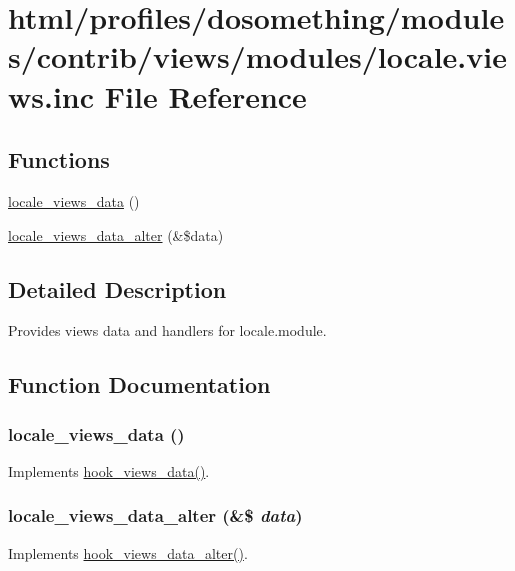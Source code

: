 \hypertarget{locale_8views_8inc}{
\section{html/profiles/dosomething/modules/contrib/views/modules/locale.views.inc File Reference}
\label{locale_8views_8inc}
}
\subsection*{Functions}
\begin{DoxyCompactItemize}
\item 
\hyperlink{locale_8views_8inc_aa2e7c82021bc70c0e3842e8430318690}{locale\_\-views\_\-data} ()
\item 
\hyperlink{locale_8views_8inc_ad47c0998c2231ae085499daa6273eea4}{locale\_\-views\_\-data\_\-alter} (\&\$data)
\end{DoxyCompactItemize}


\subsection{Detailed Description}
Provides views data and handlers for locale.module. 

\subsection{Function Documentation}
\hypertarget{locale_8views_8inc_aa2e7c82021bc70c0e3842e8430318690}{
\subsubsection[{locale\_\-views\_\-data}]{\setlength{\rightskip}{0pt plus 5cm}locale\_\-views\_\-data ()}}
\label{locale_8views_8inc_aa2e7c82021bc70c0e3842e8430318690}
Implements \hyperlink{group__views__hooks_ga227057901681e4a33e33c199c7a8c989}{hook\_\-views\_\-data()}. \hypertarget{locale_8views_8inc_ad47c0998c2231ae085499daa6273eea4}{
\subsubsection[{locale\_\-views\_\-data\_\-alter}]{\setlength{\rightskip}{0pt plus 5cm}locale\_\-views\_\-data\_\-alter (\&\$ {\em data})}}
\label{locale_8views_8inc_ad47c0998c2231ae085499daa6273eea4}
Implements \hyperlink{group__views__hooks_ga6ae0bb0d2385e03c32b57625b6d35826}{hook\_\-views\_\-data\_\-alter()}. 